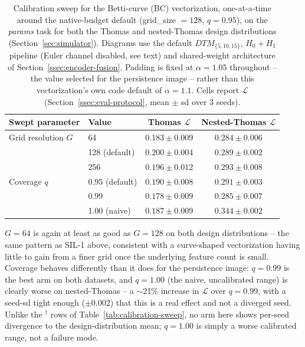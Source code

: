 \documentclass[11pt,letterpaper]{article}
\newcommand{\1}{\mathds{1}}
\theoremstyle{plain}
\theoremstyle{definitioncolon}
\begin{document}
\begin{table}[tbp]
\centering
\small
\begin{tabular}{llcc}
\toprule
Swept parameter & Value & Thomas $\mathcal{L}$ & Nested-Thomas $\mathcal{L}$ \\
\midrule
Grid resolution $G$
  & 64             & $0.183 \pm 0.009$ & $0.284 \pm 0.006$ \\
  & 128 (default)  & $0.200 \pm 0.004$ & $0.289 \pm 0.002$ \\
  & 256            & $0.196 \pm 0.012$ & $0.293 \pm 0.008$ \\
\addlinespace
Coverage $q$
  & 0.95 (default) & $0.190 \pm 0.008$ & $0.291 \pm 0.003$ \\
  & 0.99           & $0.178 \pm 0.009$ & $0.285 \pm 0.007$ \\
  & 1.00 (naive)   & $0.187 \pm 0.009$ & $0.344 \pm 0.002$ \\
\bottomrule
\end{tabular}
\caption{Calibration sweep for the Betti-curve (BC) vectorization, one-at-a-time
around the native-budget default (grid\_size $=128$, $q=0.95$), on the
\emph{params} task for both the Thomas and nested-Thomas design distributions
(Section~\ref{sec:simulator}). Diagrams use the default $DTM_{\{5,10,15\}}$,
$H_0{+}H_1$ pipeline (Euler channel disabled, see text) and shared-weight
architecture of Section~\ref{ssec:encoder-fusion}. Padding is fixed at
$\alpha=1.05$ throughout -- the value selected for the persistence image --
rather than this vectorization's own code default of $\alpha=1.1$. Cells
report $\mathcal{L}$ (Section~\ref{ssec:eval-protocol}, mean $\pm$ sd over
3 seeds).}
\label{tab:calibration-sweep-betti}
\end{table}

$G=64$ is again at least as good as $G=128$ on both design distributions --
the same pattern as SIL-1 above, consistent with a curve-shaped vectorization
having little to gain from a finer grid once the underlying feature count is
small. Coverage behaves differently than it does for the persistence image:
$q=0.99$ is the best arm on both datasets, and $q=1.00$ (the naive,
uncalibrated range) is clearly worse on nested-Thomas -- a $\sim$21\% increase
in $\mathcal{L}$ over $q=0.99$, with a seed-sd tight enough ($\pm0.002$) that
this is a real effect and not a diverged seed. Unlike the $^\dagger$ rows of
Table~\ref{tab:calibration-sweep}, no arm here shows per-seed divergence to
the design-distribution mean; $q=1.00$ is simply a worse calibrated range, not
a failure mode.
\end{document}
